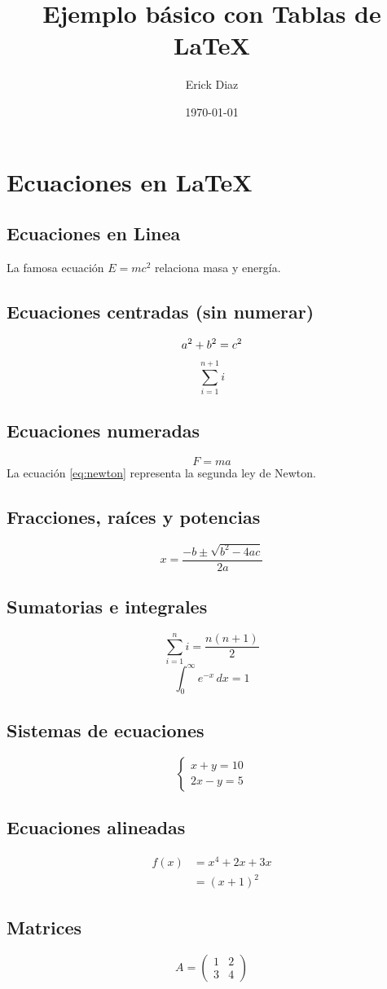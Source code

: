 \documentclass{article}
\title{Ejemplo básico con Tablas de LaTeX}
\author{Erick Diaz}
\date{\today}
\begin{document}
\maketitle

\section{Ecuaciones en LaTeX}

\subsection{Ecuaciones en Linea}
La famosa ecuación $E = mc^2$ relaciona masa y energía.

\subsection{Ecuaciones centradas (sin numerar)}
\[
a^2 + b^2 = c^2 \\
\]
\[
\sum_{i=1}^{n+1} i
\]

\subsection{Ecuaciones numeradas}
\begin{equation*}
F = ma
\label{eq:newton}
\end{equation*}
La ecuación \ref{eq:newton} representa la segunda ley de Newton.

\subsection{Fracciones, raíces y potencias}
\[
x = \frac{-b \pm \sqrt{b^2 - 4ac}}{2a}
\]

\subsection{Sumatorias e integrales}
\[
\sum_{i=1}^{n} i = \frac{n(n+1)}{2}
\]
\[
\int_{0}^{\infty} e^{-x}\,dx = 1
\]

\subsection{Sistemas de ecuaciones}
\[
\begin{cases}
x + y = 10 \\
2x - y = 5
\end{cases}
\]

\subsection{Ecuaciones alineadas}
\begin{align}
f(x) &= x^4 + 2x + 3x \\
     &= (x + 1)^2
\end{align}

\subsection{Matrices}
\[
A =
\begin{pmatrix}
1 & 2 \\
3 & 4
\end{pmatrix}
\]
\end{document}
